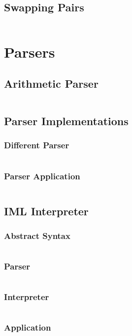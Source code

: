 \documentclass[a4paper,9pt,twoside]{book}
\newcommand{\scalafile}[1]{\inputminted[breaklines]{scala}{../scala/#1.scala}}
\begin{document}
\section{Swapping Pairs}
\scalafile{generics/Pair}

\chapter{Parsers}
\section{Arithmetic Parser}
\scalafile{parser/ArithmeticParser}
\section{Parser Implementations}
\subsection{Different Parser}
\scalafile{parser/Parser}
\subsection{Parser Application}
\scalafile{parser/ParserTest}
\section{IML Interpreter}
\subsection{Abstract Syntax}
\scalafile{parser/Syntax}
\subsection{Parser}
\scalafile{parser/IMLParser}
\subsection{Interpreter}
\scalafile{parser/Interpreter}
\subsection{Application}
\scalafile{parser/Test}
\end{document}
